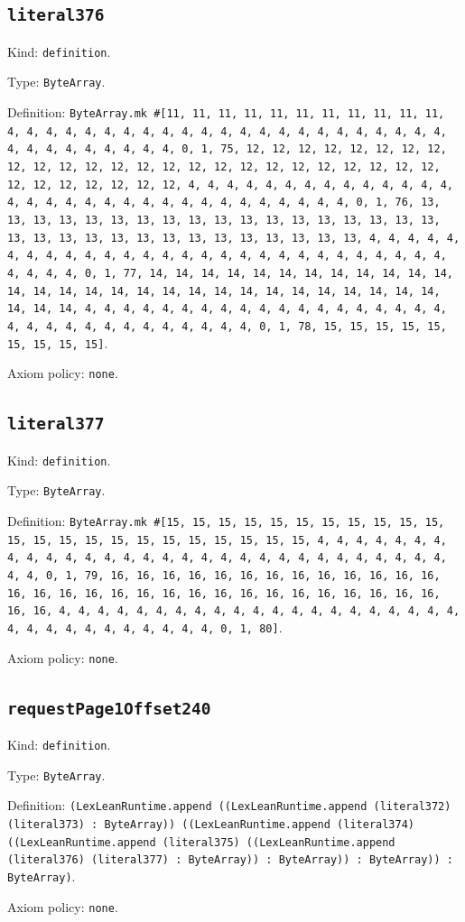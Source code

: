 \documentclass[11pt]{article}
\begin{document}
\subsection*{\texttt{literal376}}
\noindent Kind: \texttt{definition}.\par
\noindent Type: \texttt{ByteArray}.\par
\noindent Definition: \texttt{ByteArray.mk \#[11, 11, 11, 11, 11, 11, 11, 11, 11, 11, 11, 4, 4, 4, 4, 4, 4, 4, 4, 4, 4, 4, 4, 4, 4, 4, 4, 4, 4, 4, 4, 4, 4, 4, 4, 4, 4, 4, 4, 4, 4, 4, 4, 0, 1, 75, 12, 12, 12, 12, 12, 12, 12, 12, 12, 12, 12, 12, 12, 12, 12, 12, 12, 12, 12, 12, 12, 12, 12, 12, 12, 12, 12, 12, 12, 12, 12, 12, 4, 4, 4, 4, 4, 4, 4, 4, 4, 4, 4, 4, 4, 4, 4, 4, 4, 4, 4, 4, 4, 4, 4, 4, 4, 4, 4, 4, 4, 4, 4, 4, 0, 1, 76, 13, 13, 13, 13, 13, 13, 13, 13, 13, 13, 13, 13, 13, 13, 13, 13, 13, 13, 13, 13, 13, 13, 13, 13, 13, 13, 13, 13, 13, 13, 13, 13, 4, 4, 4, 4, 4, 4, 4, 4, 4, 4, 4, 4, 4, 4, 4, 4, 4, 4, 4, 4, 4, 4, 4, 4, 4, 4, 4, 4, 4, 4, 4, 4, 0, 1, 77, 14, 14, 14, 14, 14, 14, 14, 14, 14, 14, 14, 14, 14, 14, 14, 14, 14, 14, 14, 14, 14, 14, 14, 14, 14, 14, 14, 14, 14, 14, 14, 14, 4, 4, 4, 4, 4, 4, 4, 4, 4, 4, 4, 4, 4, 4, 4, 4, 4, 4, 4, 4, 4, 4, 4, 4, 4, 4, 4, 4, 4, 4, 4, 4, 0, 1, 78, 15, 15, 15, 15, 15, 15, 15, 15, 15]}.\par
\noindent Axiom policy: \texttt{none}.\par
\subsection*{\texttt{literal377}}
\noindent Kind: \texttt{definition}.\par
\noindent Type: \texttt{ByteArray}.\par
\noindent Definition: \texttt{ByteArray.mk \#[15, 15, 15, 15, 15, 15, 15, 15, 15, 15, 15, 15, 15, 15, 15, 15, 15, 15, 15, 15, 15, 15, 15, 4, 4, 4, 4, 4, 4, 4, 4, 4, 4, 4, 4, 4, 4, 4, 4, 4, 4, 4, 4, 4, 4, 4, 4, 4, 4, 4, 4, 4, 4, 4, 4, 0, 1, 79, 16, 16, 16, 16, 16, 16, 16, 16, 16, 16, 16, 16, 16, 16, 16, 16, 16, 16, 16, 16, 16, 16, 16, 16, 16, 16, 16, 16, 16, 16, 16, 16, 4, 4, 4, 4, 4, 4, 4, 4, 4, 4, 4, 4, 4, 4, 4, 4, 4, 4, 4, 4, 4, 4, 4, 4, 4, 4, 4, 4, 4, 4, 4, 4, 0, 1, 80]}.\par
\noindent Axiom policy: \texttt{none}.\par
\subsection*{\texttt{requestPage1Offset240}}
\noindent Kind: \texttt{definition}.\par
\noindent Type: \texttt{ByteArray}.\par
\noindent Definition: \texttt{(LexLeanRuntime.append ((LexLeanRuntime.append (literal372) (literal373) : ByteArray)) ((LexLeanRuntime.append (literal374) ((LexLeanRuntime.append (literal375) ((LexLeanRuntime.append (literal376) (literal377) : ByteArray)) : ByteArray)) : ByteArray)) : ByteArray)}.\par
\noindent Axiom policy: \texttt{none}.\par
\end{document}

